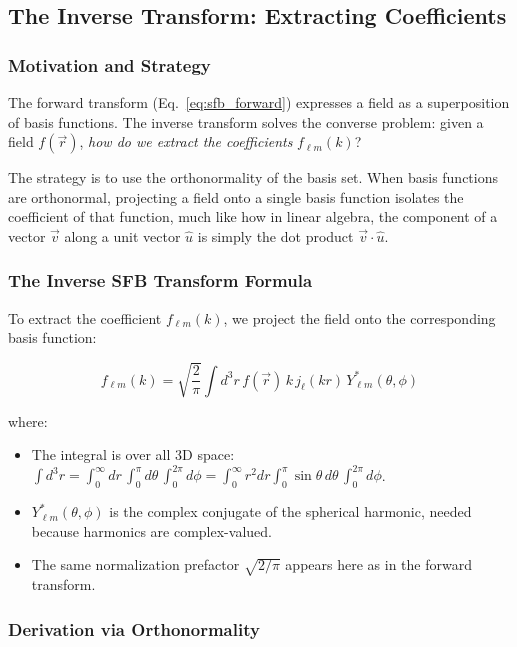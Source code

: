 \subsection{The Inverse Transform: Extracting Coefficients}

\subsubsection{Motivation and Strategy}

The forward transform (Eq.~\eqref{eq:sfb_forward}) expresses a field as a superposition of basis functions. The inverse transform solves the converse problem: given a field $f(\vec{r})$, \emph{how do we extract the coefficients} $f_{\ell m}(k)$?

The strategy is to use the orthonormality of the basis set. When basis functions are orthonormal, projecting a field onto a single basis function isolates the coefficient of that function, much like how in linear algebra, the component of a vector $\vec{v}$ along a unit vector $\hat{u}$ is simply the dot product $\vec{v} \cdot \hat{u}$.

\subsubsection{The Inverse SFB Transform Formula}

To extract the coefficient $f_{\ell m}(k)$, we project the field onto the corresponding basis function:

\begin{equation}
f_{\ell m}(k) = \sqrt{\frac{2}{\pi}} \int d^3 r \, f(\vec{r}) \, k \, j_\ell(kr) \, Y_{\ell m}^*(\theta, \phi)
\label{eq:sfb_inverse}
\end{equation}

where:
\begin{itemize}
    \item The integral is over all 3D space: $\int d^3 r = \int_0^\infty dr \, \int_0^\pi d\theta \, \int_0^{2\pi} d\phi = \int_0^\infty r^2 dr \int_0^\pi \sin\theta \, d\theta \, \int_0^{2\pi} d\phi$.
    \item $Y_{\ell m}^*(\theta, \phi)$ is the complex conjugate of the spherical harmonic, needed because harmonics are complex-valued.
    \item The same normalization prefactor $\sqrt{2/\pi}$ appears here as in the forward transform.
\end{itemize}

\subsubsection{Derivation via Orthonormality}

